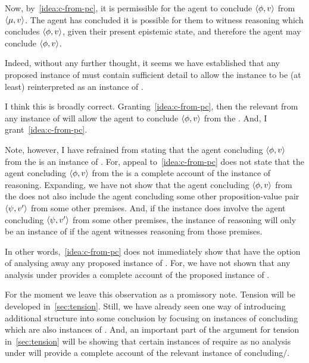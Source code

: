\begin{note}
  Now, by~\autoref{idea:c-from-pc}, it is permissible for the agent to conclude \(\langle \phi, v \rangle\) from \(\langle \mu, v \rangle\).
  The agent has concluded it is possible for them to witness reasoning which concludes \(\langle \phi, v \rangle\), given their present epistemic state, and therefore the agent may conclude \(\langle \phi, v \rangle\).

  Indeed, without any further thought, it seems we have established that any proposed instance of \adB{} must contain sufficient detail to allow the instance to be (at least) reinterpreted as an instance of \adA{}.

  I think this is broadly correct.
  Granting~\autoref{idea:c-from-pc}, then the relevant  from any instance of \adB{} will allow the agent to conclude \(\langle \phi, v \rangle\) from the .
  And, I grant~\autoref{idea:c-from-pc}.

  Note, however, I have refrained from stating that the agent concluding \(\langle \phi, v \rangle\) from the  is an instance of \adA{}.
  For, appeal to~\autoref{idea:c-from-pc} does not state that the agent concluding \(\langle \phi, v \rangle\) from the  is a complete account of the instance of reasoning.
  Expanding, we have not show that the agent concluding \(\langle \phi, v \rangle\) from the  does not also include the agent concluding some other proposition-value pair \(\langle \psi, v' \rangle\) from some other premises.
  And, if the instance does involve the agent concluding \(\langle \psi, v' \rangle\) from some other premises, the instance of reasoning will only be an instance of \adA{} if the agent witnesses reasoning from those premises.

  In other words,~\autoref{idea:c-from-pc} does not immediately show that have the option of analysing away any proposed instance of \adB{}.
  For, we have not shown that any analysis under \adA{} provides a complete account of the proposed instance of \adB{}.
\end{note}

\begin{note}
  For the moment we leave this observation as a promissory note.
  Tension will be developed in~\autoref{sec:tension}.
  Still, we have already seen one way of introducing additional structure into some conclusion by focusing on instances of concluding which are also instances of .
  And, an important part of the argument for tension in~\autoref{sec:tension} will be showing that certain instances of \csN{} require \adB{} as no analysis under \adA{} will provide a complete account of the relevant instance of concluding/.
\end{note}




